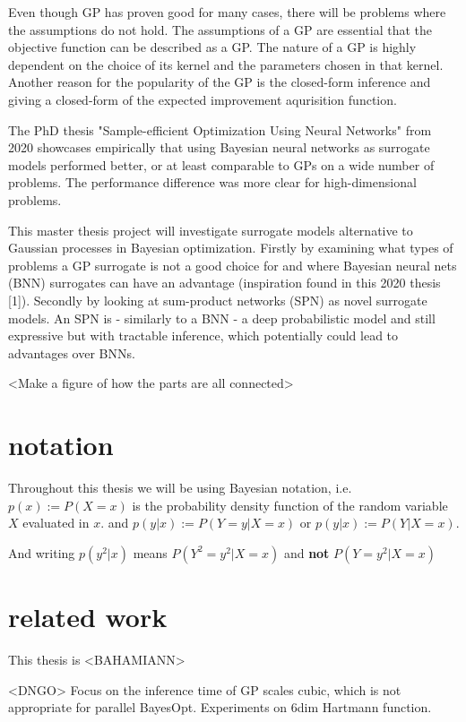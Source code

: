 Even though GP has proven good for many cases, there will be problems where the assumptions do not hold. 
The assumptions of a GP are essential that the objective function can be described as a GP.
The nature of a GP is highly dependent on the choice of its kernel and the parameters chosen in that kernel. 
Another reason for the popularity of the GP is the closed-form inference and giving a closed-form of the 
expected improvement aqurisition function. 

The PhD thesis "Sample-efficient Optimization Using Neural Networks" from 2020 \cite{PhDthesis}
showcases empirically that using Bayesian neural networks as surrogate models performed better,
or at least comparable to GPs on a wide number of problems. The performance difference was more
clear for high-dimensional problems. 

This master thesis project will investigate surrogate models alternative to Gaussian processes in
Bayesian optimization. Firstly by examining what types of problems a GP surrogate is not a good
choice for and where Bayesian neural nets (BNN) surrogates can have an advantage (inspiration found in
this 2020 thesis [1]). Secondly by looking at sum-product networks (SPN) as novel surrogate models.
An SPN is - similarly to a BNN - a deep probabilistic model and still expressive but with tractable
inference, which potentially could lead to advantages over BNNs. 


<Make a figure of how the parts are all connected>

\section{notation}
Throughout this thesis we will be using Bayesian notation, i.e. $p(x) := P(X=x)$ is 
the probability density function of the random variable $X$ evaluated in $x$. 
and $p(y|x) := P(Y=y|X=x)$ or $p(y|x) := P(Y|X=x)$.

And writing $p(y^2|x)$ means $P(Y^2=y^2|X=x)$ and \textbf{not} $P(Y=y^2|X=x)$

\section{related work}
This thesis is 
<BAHAMIANN>

<DNGO>
Focus on the inference time of GP scales cubic, which is not appropriate for
parallel BayesOpt. 
Experiments on 6dim Hartmann function. 


